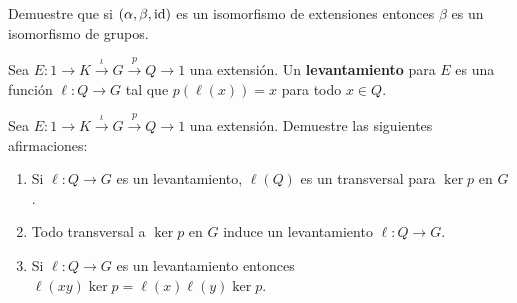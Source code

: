 \begin{exercise}
	Demuestre que si $(\alpha,\beta,\operatorname{id})$ es un isomorfismo de extensiones
	entonces $\beta$ es un isomorfismo de grupos.
\end{exercise}

	

%

\begin{definition}
	Sea $E\colon 1\to K\xrightarrow{\iota}G\xrightarrow{p} Q\to1$ una
	extensión.  Un \textbf{levantamiento} para $E$ es una función $\ell\colon
	Q\to G$ tal que $p(\ell(x))=x$ para todo $x\in Q$. 
\end{definition}

\begin{exercise}
	\label{exercise:lifting}
	Sea $E\colon 1\to K\xrightarrow{\iota}G\xrightarrow{p} Q\to1$ una
	extensión.  Demuestre las siguientes afirmaciones:
	\begin{enumerate}
		\item Si $\ell\colon Q\to G$ es un levantamiento, $\ell(Q)$
			es un transversal para $\ker p$ en $G$.
		\item Todo transversal a $\ker p$ en $G$ induce un levantamiento $\ell\colon
			Q\to G$.
		\item Si $\ell\colon Q\to G$ es un levantamiento entonces
			$\ell(xy)\ker p=\ell(x)\ell(y)\ker p$.
	\end{enumerate}
\end{exercise}


